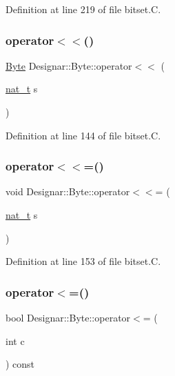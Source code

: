 Definition at line 219 of file bitset.\+C.

\mbox{\label{class_designar_1_1_byte_abd14d60584eec419a494785dc66e1156}} 
\subsubsection{\texorpdfstring{operator$<$$<$()}{operator<<()}}
{\footnotesize\ttfamily \hyperlink{class_designar_1_1_byte}{Byte} Designar\+::\+Byte\+::operator$<$$<$ (\begin{DoxyParamCaption}\item[{\hyperlink{namespace_designar_aa72662848b9f4815e7bf31a7cf3e33d1}{nat\+\_\+t}}]{s }\end{DoxyParamCaption})}



Definition at line 144 of file bitset.\+C.

\mbox{\label{class_designar_1_1_byte_a6d13481b7b6bc22a62c1b8998d851c29}} 
\subsubsection{\texorpdfstring{operator$<$$<$=()}{operator<<=()}}
{\footnotesize\ttfamily void Designar\+::\+Byte\+::operator$<$$<$= (\begin{DoxyParamCaption}\item[{\hyperlink{namespace_designar_aa72662848b9f4815e7bf31a7cf3e33d1}{nat\+\_\+t}}]{s }\end{DoxyParamCaption})}



Definition at line 153 of file bitset.\+C.

\mbox{\label{class_designar_1_1_byte_aec225f858e548268a54d23bb828cc12f}} 
\subsubsection{\texorpdfstring{operator$<$=()}{operator<=()}}
{\footnotesize\ttfamily bool Designar\+::\+Byte\+::operator$<$= (\begin{DoxyParamCaption}\item[{int}]{c }\end{DoxyParamCaption}) const}



